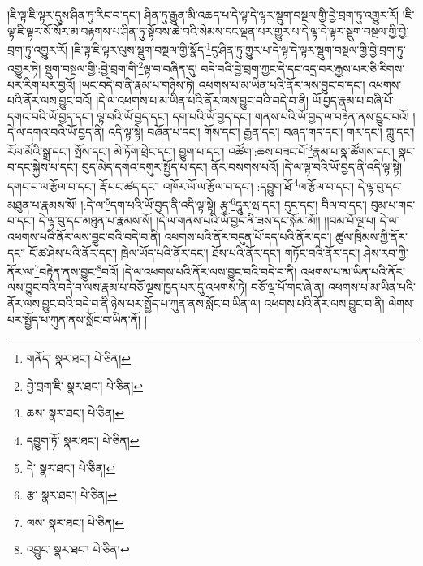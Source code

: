 །ཇི་ལྟ་ཇི་ལྟར་དུས་ཤིན་ཏུ་རིང་བ་དང་། ཤིན་ཏུ་རྒྱུན་མི་འཆད་པ་དེ་ལྟ་དེ་ལྟར་སྡུག་བསྔལ་གྱི་བྱེ་བྲག་ཏུ་འགྱུར་རོ། །ཇི་ལྟ་ཇི་ལྟར་སོ་སོར་མ་བརྟགས་པ་ཤིན་ཏུ་སྟོབས་ཆེ་བའི་སེམས་དང་ལྡན་པར་གྱུར་པ་དེ་ལྟ་དེ་ལྟར་སྡུག་བསྔལ་གྱི་བྱེ་བྲག་ཏུ་འགྱུར་རོ། །ཇི་ལྟ་ཇི་ལྟར་ལུས་སྡུག་བསྔལ་གྱི་སྣོད་\footnote{གནོད་  སྣར་ཐང་།  པེ་ཅིན། }དུ་ཤིན་ཏུ་གྱུར་པ་དེ་ལྟ་དེ་ལྟར་སྡུག་བསྔལ་གྱི་བྱེ་བྲག་ཏུ་འགྱུར་ཏེ། སྡུག་བསྔལ་གྱི་:བྱེ་བྲག་གི་\footnote{བྱེ་བྲག་ཇི་  སྣར་ཐང་།  པེ་ཅིན། }ལྟ་བ་བཞིན་དུ། བདེ་བའི་བྱེ་བྲག་ཀྱང་དེ་དང་འདྲ་བར་རྒྱས་པར་ཅི་རིགས་པར་རིག་པར་བྱའོ། །ཡང་བདེ་བ་ནི་རྣམ་པ་གཉིས་ཏེ། འཕགས་པ་མ་ཡིན་པའི་ནོར་ལས་བྱུང་བ་དང་། འཕགས་པའི་ནོར་ལས་བྱུང་བའོ། །དེ་ལ་འཕགས་པ་མ་ཡིན་པའི་ནོར་ལས་བྱུང་བའི་བདེ་བ་ནི། ཡོ་བྱད་རྣམ་པ་བཞི་པོ་དགའ་བའི་ཡོ་བྱད་དང་། ལྟ་བའི་ཡོ་བྱད་དང་། དག་པའི་ཡོ་བྱད་དང་། གནས་པའི་ཡོ་བྱད་ལ་བརྟེན་ནས་བྱུང་བའོ། །དེ་ལ་དགའ་བའི་ཡོ་བྱད་ནི། འདི་ལྟ་སྟེ། བཞོན་པ་དང་། གོས་དང་། རྒྱན་དང་། བཞད་གད་དང་། གར་དང་། གླུ་དང་། རོལ་མོའི་སྒྲ་དང་། སྤོས་དང་། མེ་ཏོག་ཕྲེང་དང་། བྱུག་པ་དང་། འཚོག་:ཆས་བཟང་པོ་\footnote{ཆས་  སྣར་ཐང་།  པེ་ཅིན། }རྣམ་པ་སྣ་ཚོགས་དང་། སྣང་བ་དང་སྐྱེས་པ་དང་། བུད་མེད་དགའ་དགུར་སྤྱོད་པ་དང་། ནོར་བསགས་པའོ། །དེ་ལ་ལྟ་བའི་ཡོ་བྱད་ནི་འདི་ལྟ་སྟེ། དགང་བ་ལ་རྩོལ་བ་དང་། རྡོ་པང་ཚད་དང་། འཁོར་ལོ་ལ་རྩོལ་བ་དང་། :དབྱུག་ཐོ་\footnote{དབྱུག་ཏོ་  སྣར་ཐང་།  པེ་ཅིན། }ལ་རྩོལ་བ་དང་། དེ་ལྟ་བུ་དང་མཐུན་པ་རྣམས་སོ། །:དེ་ལ་\footnote{དེ་  སྣར་ཐང་།  པེ་ཅིན། }དག་པའི་ཡོ་བྱད་ནི་འདི་ལྟ་སྟེ། རྩྭ་\footnote{རྩ་  སྣར་ཐང་།  པེ་ཅིན། }དཱུར་ཝ་དང་། དུང་དང་། བིལ་བ་དང་། བུམ་པ་གང་བ་དང་། དེ་ལྟ་བུ་དང་མཐུན་པ་རྣམས་སོ། །དེ་ལ་གནས་པའི་ཡོ་བྱད་ནི་ཟས་དང་སྐོམ་མོ།། །།བམ་པོ་ལྔ་པ། དེ་ལ་འཕགས་པའི་ནོར་ལས་བྱུང་བའི་བདེ་བ་ནི། འཕགས་པའི་ནོར་བདུན་པོ་དད་པའི་ནོར་དང་། ཚུལ་ཁྲིམས་ཀྱི་ནོར་དང་། ངོ་ཚ་ཤེས་པའི་ནོར་དང་། ཁྲེལ་ཡོད་པའི་ནོར་དང་། ཐོས་པའི་ནོར་དང་། གཏོང་བའི་ནོར་དང་། ཤེས་རབ་ཀྱི་ནོར་ལ་\footnote{ལས་  སྣར་ཐང་།  པེ་ཅིན། }བརྟེན་ནས་བྱུང་\footnote{འབྱུང་  སྣར་ཐང་།  པེ་ཅིན། }བའོ། །དེ་ལ་འཕགས་པའི་ནོར་ལས་བྱུང་བའི་བདེ་བ་ནི། འཕགས་པ་མ་ཡིན་པའི་ནོར་ལས་བྱུང་བའི་བདེ་བ་ལས་རྣམ་པ་བཅོ་ལྔས་ཁྱད་པར་དུ་འཕགས་ཏེ། བཅོ་ལྔ་པོ་གང་ཞེ་ན། འཕགས་པ་མ་ཡིན་པའི་ནོར་ལས་བྱུང་བའི་བདེ་བ་ནི་ཉེས་པར་སྤྱོད་པ་ཀུན་ནས་སློང་བ་ཡིན་ལ། འཕགས་པའི་ནོར་ལས་བྱུང་བ་ནི། ལེགས་པར་སྤྱོད་པ་ཀུན་ནས་སློང་བ་ཡིན་ནོ། །
